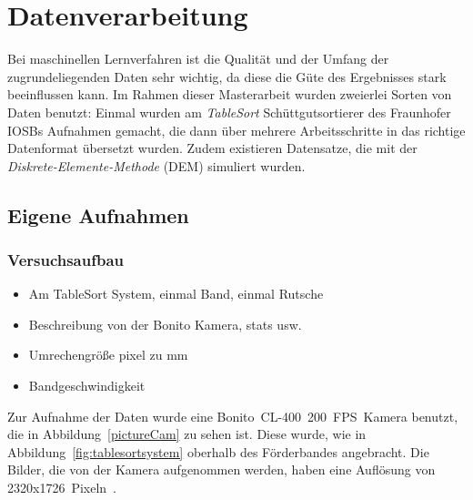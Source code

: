 \chapter{Datenverarbeitung}

Bei maschinellen Lernverfahren ist die Qualität und der Umfang der zugrundeliegenden Daten sehr wichtig,
da diese die Güte des Ergebnisses stark beeinflussen kann.
Im Rahmen dieser Masterarbeit wurden zweierlei Sorten von Daten benutzt:
Einmal wurden am \textit{TableSort} Schüttgutsortierer des Fraunhofer IOSBs Aufnahmen gemacht, 
die dann über mehrere Arbeitsschritte in das richtige Datenformat übersetzt wurden.
Zudem existieren Datensatze, die mit der \textit{Diskrete-Elemente-Methode} (DEM) simuliert wurden. 





\section{Eigene Aufnahmen}

\subsection{Versuchsaufbau}

\color{blue}
\begin{itemize}
	\item Am TableSort System, einmal Band, einmal Rutsche
	\item Beschreibung von der Bonito Kamera, stats usw.
	\item Umrechengröße pixel zu mm
	\item Bandgeschwindigkeit
\end{itemize}
\color{black}


Zur Aufnahme der Daten wurde eine Bonito~CL-400~200~FPS~Kamera benutzt, die in Abbildung~\ref{pictureCam} zu sehen ist.
Diese wurde, wie in Abbildung~\ref{fig:tablesortsystem} oberhalb des Förderbandes angebracht.
Die Bilder, die von der Kamera aufgenommen werden, haben eine Auflösung von 2320x1726~Pixeln~\cite{alliedvisiontechnologiesgmbh2014}.

